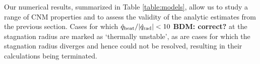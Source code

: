 \documentclass[usenatbib,fleqn]{mn2e}
\newcommand{\Mbh}[1][]{M_{\bullet#1}}
\begin{document}

Our numerical results, summarized in Table \ref{table:models}, allow us to study a range of CNM properties and to assess the validity of the analytic estimates from the previous section.  Cases for which $\dot{q}_{\rm heat}/|\dot{q}_{\rm rad}|< 10$ {\bf BDM: correct?} at the stagnation radius are marked as `thermally unstable', as are cases for which the stagnation radius diverges and hence could not be resolved, resulting in their calculations being terminated.  
\end{document}
